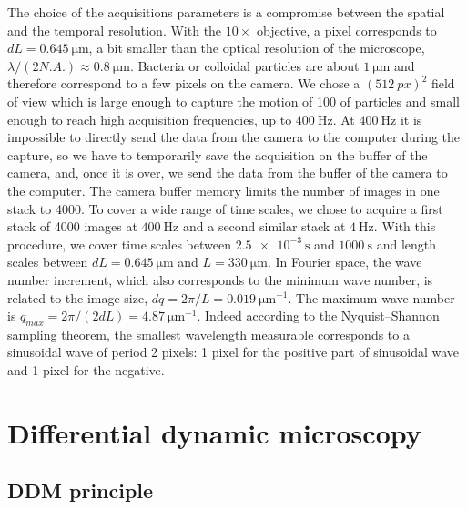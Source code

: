 \documentclass[prb,reprint,amsmath,amssymb]{revtex4-1}
\begin{document}
The choice of the acquisitions parameters is a compromise between the spatial and the temporal resolution. With the $10\times$ objective, a pixel corresponds to $dL=\SI{0.645}{\micro\meter}$, a bit smaller than the optical resolution of the microscope, $\lambda/(2N.A.)\approx\SI{0.8}{\micro\meter} $. Bacteria or colloidal particles are about $\SI{1}{\micro\meter}$ and therefore correspond to a few pixels on the camera. We chose a $(\SI{512}{px})^2$ field of view which is large enough to capture the motion of 100 of particles and small enough to reach high acquisition frequencies, up to $\SI{400}{\hertz}$. At $\SI{400}{\hertz}$ it is impossible to directly send the data from the camera to the computer during the capture, so we have to temporarily save the acquisition on the buffer of the camera, and, once it is over, we send the data from the buffer of the camera to the computer. The camera buffer memory limits the number of images in one stack to 4000. To cover a wide range of time scales, we chose to acquire a first stack of 4000 images at $\SI{400}{\hertz}$ and a second similar stack at $\SI{4}{\hertz}$. With this procedure, we cover time scales between $\SI{2.5e-3}{\second}$ and $\SI{1000}{\second}$ and length scales between $dL=\SI{0.645}{\micro\meter}$ and $L=\SI{330}{\micro\meter}$. In Fourier space, the wave number increment, which also corresponds to the minimum wave number, is related to the image size, $dq=2\pi/L=\SI{0.019}{\micro\meter^{-1}}$. The maximum wave number is $q_{max}=2\pi/(2dL)=\SI{4.87}{\micro\meter^{-1}}$. Indeed according to the Nyquist–Shannon sampling theorem, the smallest wavelength measurable corresponds to a sinusoidal wave of period 2 pixels: 1 pixel for the positive part of sinusoidal wave and 1 pixel for the negative.

\section{Differential dynamic microscopy}
\label{sec:ddm}
\subsection{DDM principle}
\end{document}
